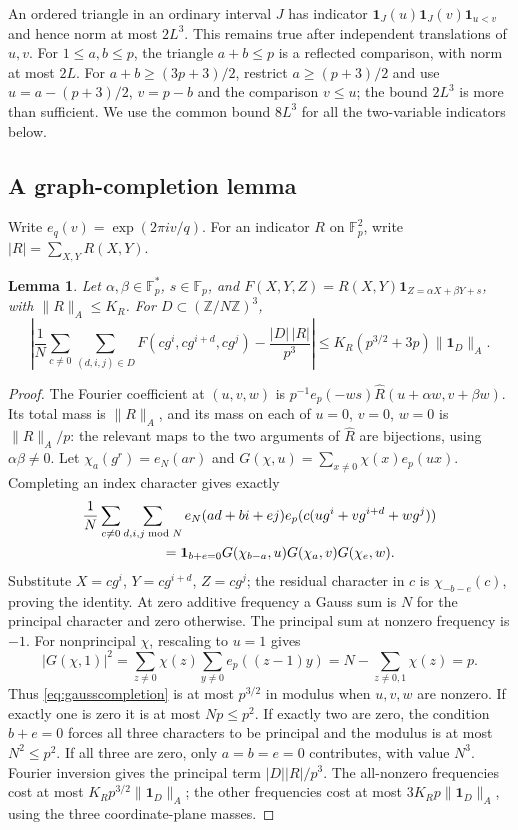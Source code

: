 \documentclass[10pt]{amsart}
\newtheorem{lemma}{Lemma}[section]
\theoremstyle{remark}
\newcommand{\Fp}{\mathbb F_p}
\newcommand{\ind}{\mathbf 1}
\newcommand{\normA}[1]{\lVert #1\rVert_A}
\begin{document}
An ordered triangle in an ordinary interval $J$ has indicator
$\ind_J(u)\ind_J(v)\ind_{u<v}$ and hence norm at most $2L^3$.
This remains true after independent translations of $u,v$.
For $1\le a,b\le p$, the triangle $a+b\le p$ is a reflected
comparison, with norm at most $2L$. For
$a+b\ge(3p+3)/2$, restrict $a\ge(p+3)/2$ and use
$u=a-(p+3)/2$, $v=p-b$ and the comparison $v\le u$;
the bound $2L^3$ is more than sufficient. We use the common bound
$8L^3$ for all the two-variable indicators below.

\subsection{A graph-completion lemma}
Write $e_q(v)=\exp(2\pi iv/q)$. For an indicator $R$ on $\Fp^2$,
write $|R|=\sum_{X,Y}R(X,Y)$.
\begin{lemma}\label{lem:graph}
Let $\alpha,\beta\in\Fp^*$, $s\in\Fp$, and
$F(X,Y,Z)=R(X,Y)\ind_{Z=\alpha X+\beta Y+s}$, with
$\normA R\le K_R$. For $D\subset(\mathbb Z/N\mathbb Z)^3$,
\begin{equation}\label{eq:graph}
 \left|\frac1N\sum_{c\ne0}\sum_{(d,i,j)\in D}
 F(cg^i,cg^{i+d},cg^j)-\frac{|D|\,|R|}{p^3}\right|
 \le K_R(p^{3/2}+3p)\normA{\ind_D}.
\end{equation}
\end{lemma}
\begin{proof}
The Fourier coefficient at $(u,v,w)$ is
$p^{-1}e_p(-ws)\widehat R(u+\alpha w,v+\beta w)$.
Its total mass is $\normA R$, and its mass on each of $u=0$, $v=0$,
$w=0$ is $\normA R/p$: the relevant maps to the two arguments of
$\widehat R$ are bijections, using $\alpha\beta\ne0$.
Let $\chi_a(g^r)=e_N(ar)$ and
$G(\chi,u)=\sum_{x\ne0}\chi(x)e_p(ux)$. Completing an index
character gives exactly
\begin{align}\label{eq:gausscompletion}
 &\frac1N\sum_{c\ne0}\sum_{d,i,j\bmod N}
 e_N(ad+bi+ej)e_p(c(ug^i+vg^{i+d}+wg^j))\notag\\
 &\hspace{20mm}=\ind_{b+e=0}
 G(\chi_{b-a},u)G(\chi_a,v)G(\chi_e,w).
\end{align}
Substitute $X=cg^i$, $Y=cg^{i+d}$, $Z=cg^j$; the residual character
in $c$ is $\chi_{-b-e}(c)$, proving the identity.
At zero additive frequency a Gauss sum is $N$ for the principal
character and zero otherwise. The principal sum at nonzero frequency
is $-1$. For nonprincipal $\chi$, rescaling to $u=1$ gives
\[
 |G(\chi,1)|^2=\sum_{z\ne0}\chi(z)
 \sum_{y\ne0}e_p((z-1)y)
 =N-\sum_{z\ne0,1}\chi(z)=p.
\]
Thus \eqref{eq:gausscompletion} is at most $p^{3/2}$ in modulus when
$u,v,w$ are nonzero. If exactly one is zero it is at most $Np\le p^2$.
If exactly two are zero, the condition $b+e=0$ forces all three
characters to be principal and the modulus is at most $N^2\le p^2$.
If all three are zero, only $a=b=e=0$ contributes, with value $N^3$.
Fourier inversion gives the principal term $|D||R|/p^3$.
The all-nonzero frequencies cost at most
$K_Rp^{3/2}\normA{\ind_D}$; the other frequencies cost at most
$3K_Rp\normA{\ind_D}$, using the three coordinate-plane masses.
\end{proof}
\end{document}
